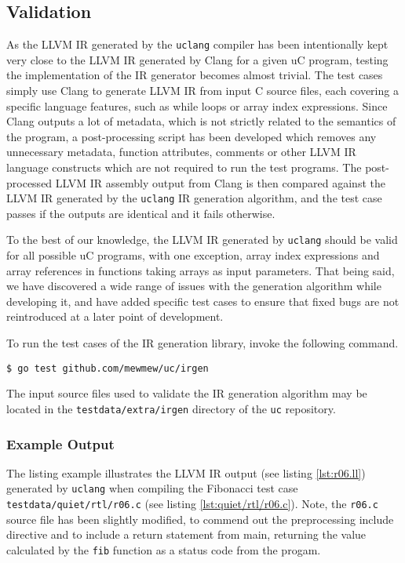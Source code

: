 \subsection{Validation}
\label{sec:irgen_validation}

As the LLVM IR generated by the \texttt{uclang} compiler has been intentionally kept very close to the LLVM IR generated by Clang for a given uC program, testing the implementation of the IR generator becomes almost trivial. The test cases simply use Clang to generate LLVM IR from input C source files, each covering a specific language features, such as while loops or array index expressions. Since Clang outputs a lot of metadata, which is not strictly related to the semantics of the program, a post-processing script has been developed which removes any unnecessary metadata, function attributes, comments or other LLVM IR language constructs which are not required to run the test programs. The post-processed LLVM IR assembly output from Clang is then compared against the LLVM IR generated by the \texttt{uclang} IR generation algorithm, and the test case passes if the outputs are identical and it fails otherwise.

To the best of our knowledge, the LLVM IR generated by \texttt{uclang} should be valid for all possible uC programs, with one exception, array index expressions and array references in functions taking arrays as input parameters. That being said, we have discovered a wide range of issues with the generation algorithm while developing it, and have added specific test cases to ensure that fixed bugs are not reintroduced at a later point of development.

To run the test cases of the IR generation library, invoke the following command.

\begin{verbatim}
$ go test github.com/mewmew/uc/irgen
\end{verbatim}

The input source files used to validate the IR generation algorithm may be located in the \texttt{testdata/extra/irgen} directory of the \texttt{uc} repository.

\subsubsection{Example Output}

The listing example illustrates the LLVM IR output (see listing \ref{lst:r06.ll}) generated by \texttt{uclang} when compiling the Fibonacci test case \texttt{testdata/quiet/rtl/r06.c} (see listing \ref{lst:quiet/rtl/r06.c}). Note, the \texttt{r06.c} source file has been slightly modified, to commend out the preprocessing include directive and to include a return statement from main, returning the value calculated by the \texttt{fib} function as a status code from the progam.

